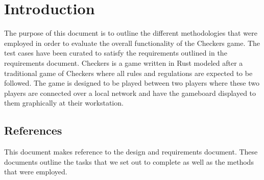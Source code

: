\section{Introduction}
The purpose of this document is to outline the different methodologies that were
employed in order to evaluate the overall functionality of the Checkers game. The test cases
have been curated to satisfy the requirements outlined in the requirements document. Checkers 
is a game written in Rust modeled after a traditional game of Checkers where all rules and 
regulations are expected to be followed. The game is designed to be played between two players 
where these two players are connected over a local network and have the gameboard displayed to them 
graphically at their workstation.
\subsection{References}
This document makes reference to the design and requirements document. These documents
 outline the tasks that we set out to complete as well as the methods that were employed.